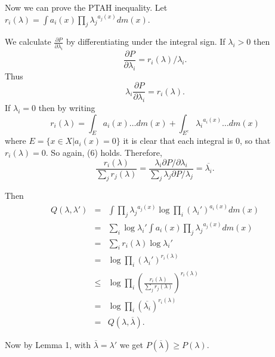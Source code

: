\documentclass[12pt]{article}
\begin{document}
Now we can prove the PTAH inequality. 
Let $r_i(\lambda) = \int a_i(x) \prod_j {\lambda_j}^{a_j(x)} dm(x)$.

We calculate $\frac{\partial P}{\partial \lambda_i}$ by differentiating
under the integral sign. If $\lambda_i>0$ then
$$
\frac{\partial P}{\partial \lambda_i} = r_i(\lambda)/\lambda_i .
$$
Thus
\begin{equation}
\lambda_i \frac{\partial P}{\partial \lambda_i} = r_i(\lambda).
\end{equation}
If $\lambda_i =0$ then by writing 
$$
r_i(\lambda) = \int_E a_i(x) \ldots dm(x) + \int_{E^c} {\lambda_i}^{a_i(x)} \ldots dm(x)
$$ 
where $E = \{x \in X | a_i(x) =0\}$
it is clear that each integral is 0, so that $r_i(\lambda) =0$.
So again, (6) holds. Therefore,
$$
 \frac{r_i(\lambda)}{\sum_j r_j (\lambda)} =  \frac{\lambda_i \partial P/\partial \lambda_i }{\sum_j \lambda_j \partial P/\lambda_j} = \overline{\lambda_i}. 
$$

Then
\begin{eqnarray*}
Q(\lambda, \lambda') &=& \int  \prod_j {\lambda_j}^{a_j(x)} \log \prod_i ( {\lambda_i}')^{a_i(x)} dm(x)\\
& =&\sum_i \log {\lambda_i}' \int a_i(x) \prod_j {\lambda_j}^{a_j(x)} dm(x) \\
&=& \sum_i r_i(\lambda) \log {\lambda_i}' \\
&=& \log \prod_i ({\lambda_i}')^{r_i(\lambda)} \\
& \le&\log \prod_i ( \frac{r_i(\lambda)}{\sum_j r_j(\lambda)})^{r_i(\lambda)} \\
& =& \log \prod_i ({\overline{\lambda_i}})^{ r_i(\lambda) }\\
& =& Q(\lambda , \overline{\lambda}).
\end{eqnarray*}

Now by Lemma 1, with $\overline{\lambda} = \lambda'$ we get
$P(\overline{\lambda}) \ge P(\lambda)$.






\end{document}
